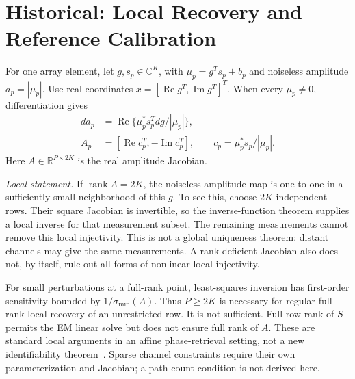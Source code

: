 \documentclass[journal]{IEEEtran}
\newcommand{\R}{\mathbb R}
\DeclareMathOperator{\rank}{rank}
\begin{document}










\section{Historical: Local Recovery and Reference Calibration}
For one array element, let $g,s_p\in\mathbb C^K$, with
$\mu_p=g^Ts_p+b_p$ and noiseless amplitude $a_p=|\mu_p|$.
Use real coordinates $x=[\operatorname{Re}g^T,\operatorname{Im}g^T]^T$.
When every $\mu_p\ne0$, differentiation gives
\begin{align}
 da_p&=\operatorname{Re}\{\mu_p^*s_p^T dg/|\mu_p|\},\\
 A_p&=[\operatorname{Re}c_p^T,-\operatorname{Im}c_p^T],\qquad
 c_p=\mu_p^*s_p/|\mu_p|.
\end{align}
Here $A\in\R^{P\times2K}$ is the real amplitude Jacobian.

\textit{Local statement.} If $\rank A=2K$, the noiseless amplitude map
is one-to-one in a sufficiently small neighborhood of this $g$.
To see this, choose $2K$ independent rows. Their square Jacobian is
invertible, so the inverse-function theorem supplies a local inverse for
that measurement subset. The remaining measurements cannot remove this
local injectivity. This is not a global uniqueness theorem: distant
channels may give the same measurements. A rank-deficient Jacobian also
does not, by itself, rule out all forms of nonlinear local injectivity.

For small perturbations at a full-rank point, least-squares inversion has
first-order sensitivity bounded by $1/\sigma_{\min}(A)$.
Thus $P\ge2K$ is necessary for regular full-rank local recovery of an
unrestricted row. It is not sufficient. Full row rank of $S$ permits
the EM linear solve but does not ensure full rank of $A$. These are
standard local arguments in an affine phase-retrieval setting, not a new
identifiability theorem~\cite{gao2018}. Sparse channel constraints require their own
parameterization and Jacobian; a path-count condition is not derived here.
\end{document}
